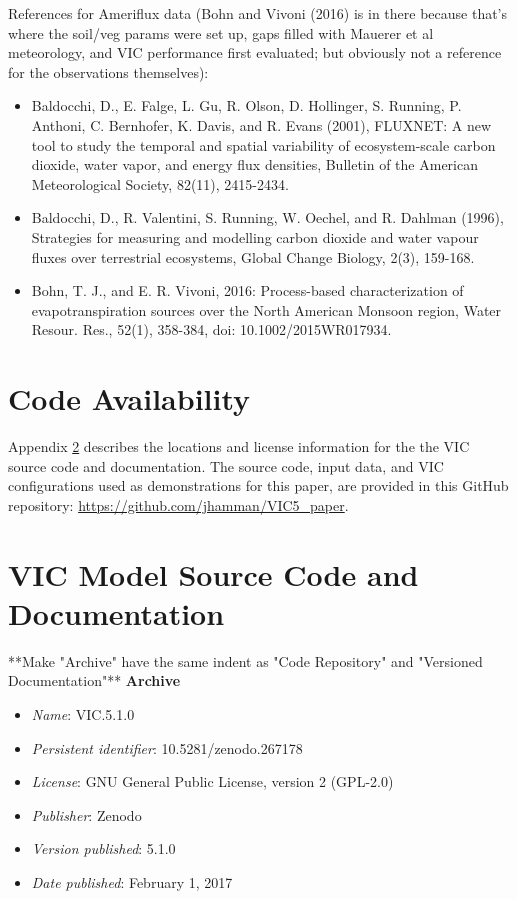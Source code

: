 \documentclass[gmd, manuscript]{copernicus}
\begin{document}
References for Ameriflux data (Bohn and Vivoni (2016) is in there because that's where the soil/veg params were set up, gaps filled with Mauerer et al meteorology, and VIC performance first evaluated; but obviously not a reference for the observations themselves):
\begin{itemize}
\item Baldocchi, D., E. Falge, L. Gu, R. Olson, D. Hollinger, S. Running, P. Anthoni, C. Bernhofer, K. Davis, and R. Evans (2001), FLUXNET: A new tool to study the temporal and spatial variability of ecosystem-scale carbon dioxide, water vapor, and energy flux densities, Bulletin of the American Meteorological Society, 82(11), 2415-2434.
\item Baldocchi, D., R. Valentini, S. Running, W. Oechel, and R. Dahlman (1996), Strategies for measuring and modelling carbon dioxide and water vapour fluxes over terrestrial ecosystems, Global Change Biology, 2(3), 159-168.
\item Bohn, T. J., and E. R. Vivoni, 2016: Process-based characterization of evapotranspiration sources over the North American Monsoon region, Water Resour. Res., 52(1), 358-384, doi: 10.1002/2015WR017934.
\end{itemize}

\section{Code Availability}
\label{appendix:code_avail}

  Appendix \ref{appendix:source_code} describes the locations and license information for the the VIC source code and documentation. The source code, input data, and VIC configurations used as demonstrations for this paper, are provided in this GitHub repository: \url{https://github.com/jhamman/VIC5_paper}.

\appendix
\section{VIC Model Source Code and Documentation}
\label{appendix:source_code}

**Make "Archive" have the same indent as "Code Repository" and "Versioned Documentation"**
{\bf Archive}

\begin{itemize}
	\item \textit{Name}: VIC.5.1.0
	\item \textit{Persistent identifier}: 10.5281/zenodo.267178
	\item \textit{License}: GNU General Public License, version 2 (GPL-2.0)
	\item \textit{Publisher}:  Zenodo
	\item \textit{Version published}: 5.1.0
	\item \textit{Date published}: February 1, 2017
\end{itemize}
\end{document}

